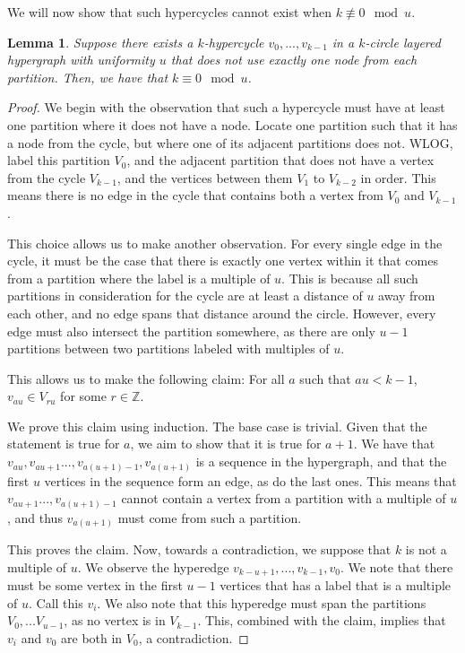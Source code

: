 \documentclass[11pt,letterpaper,pdftex]{article}
\newtheorem{lemma}[theorem]{Lemma}
\begin{document}
We will now show that such hypercycles cannot exist when $k \not\equiv 0 \mod{u}$.

\begin{lemma}\label{lem:no_short_backward_cycles}
Suppose there exists a $k$-hypercycle $v_0,...,v_{k-1}$ in a $k$-circle layered hypergraph with uniformity $u$ that does not use exactly one node from each partition. Then, we have that $k\equiv 0 \mod{u}$.
\end{lemma}
\begin{proof}
We begin with the observation that such a hypercycle must have at least one partition where it does not have a node. Locate one partition such that it has a node from the cycle, but where one of its adjacent partitions does not. WLOG, label this partition $V_0$, and the adjacent partition that does not have a vertex from the cycle $V_{k-1}$, and the vertices between them $V_1$ to $V_{k-2}$ in order. This means there is no edge in the cycle that contains both a vertex from $V_0$ and $V_{k-1}$.

This choice allows us to make another observation. For every single edge in the cycle, it must be the case that there is exactly one vertex within it that comes from a partition where the label is a multiple of $u$. This is because all such partitions in consideration for the cycle are at least a distance of $u$ away from each other, and no edge spans that distance around the circle. However, every edge must also intersect the partition somewhere, as there are only $u-1$ partitions between two partitions labeled with multiples of $u$.

This allows us to make the following claim: For all $a$ such that $au < k-1$, $v_{au}\in V_{ru}$ for some $r\in \mathbb Z$.

We prove this claim using induction. The base case is trivial. Given that the statement is true for $a$, we aim to show that it is true for $a+1$. We have that $v_{au}, v_{au + 1}..., v_{a(u+1)-1}, v_{a(u+1)}$ is a sequence in the hypergraph, and that the first $u$ vertices in the sequence form an edge, as do the last ones. This means that $v_{au + 1}..., v_{a(u+1)-1}$ cannot contain a vertex from a partition with a multiple of $u$, and thus $v_{a(u+1)}$ must come from such a partition.

This proves the claim. Now, towards a contradiction, we suppose that $k$ is not a multiple of $u$. We observe the hyperedge $v_{k-u+1}, ..., v_{k-1}, v_0$. We note that there must be some vertex in the first $u-1$ vertices that has a label that is a multiple of $u$. Call this $v_i$. We also note that this hyperedge must span the partitions $V_0,...V_{u-1}$, as no vertex is in $V_{k-1}$. This, combined with the claim, implies that $v_i$ and $v_0$ are both in $V_0$, a contradiction.
\end{proof}
\end{document}
